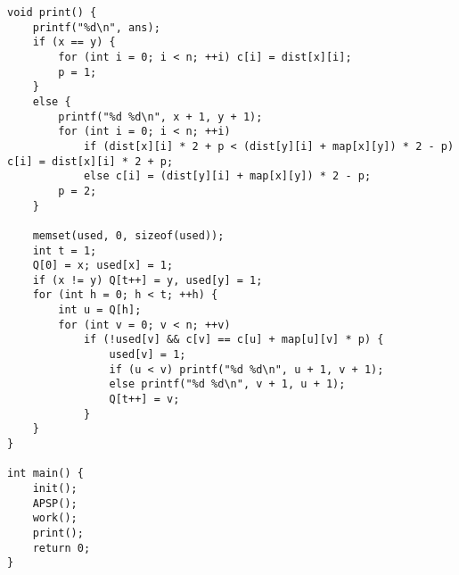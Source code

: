 \begin{verbatim}
void print() {
    printf("%d\n", ans);
    if (x == y) {
        for (int i = 0; i < n; ++i) c[i] = dist[x][i];
        p = 1;
    }
    else {
        printf("%d %d\n", x + 1, y + 1);
        for (int i = 0; i < n; ++i)
            if (dist[x][i] * 2 + p < (dist[y][i] + map[x][y]) * 2 - p) c[i] = dist[x][i] * 2 + p;
            else c[i] = (dist[y][i] + map[x][y]) * 2 - p;
        p = 2;
    }

    memset(used, 0, sizeof(used));
    int t = 1;
    Q[0] = x; used[x] = 1;
    if (x != y) Q[t++] = y, used[y] = 1;
    for (int h = 0; h < t; ++h) {
        int u = Q[h];
        for (int v = 0; v < n; ++v)
            if (!used[v] && c[v] == c[u] + map[u][v] * p) {
                used[v] = 1;
                if (u < v) printf("%d %d\n", u + 1, v + 1);
                else printf("%d %d\n", v + 1, u + 1);
                Q[t++] = v;
            }
    }
}

int main() {
    init();
    APSP();
    work();
    print();
    return 0;
}
\end{verbatim}
